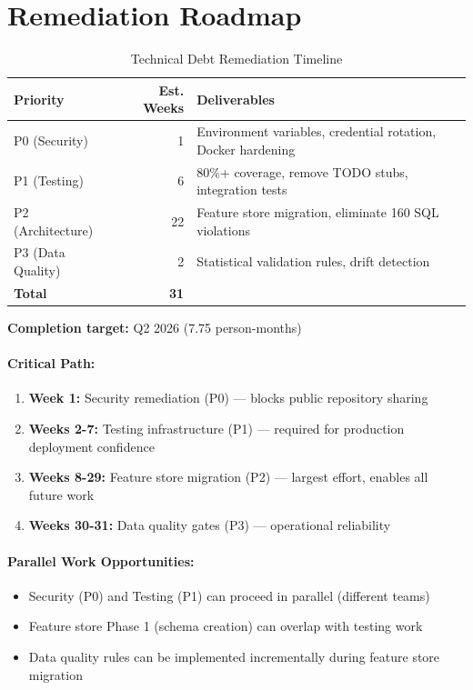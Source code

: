 \section{Remediation Roadmap}

\begin{table}[htbp]
\centering
\caption{Technical Debt Remediation Timeline}
\label{tab:remediation_timeline}
\begin{tabular}{@{}lrp{5cm}@{}}
\toprule
\textbf{Priority} & \textbf{Est. Weeks} & \textbf{Deliverables} \\
\midrule
P0 (Security) & 1 & Environment variables, credential rotation, Docker hardening \\
P1 (Testing) & 6 & 80\%+ coverage, remove TODO stubs, integration tests \\
P2 (Architecture) & 22 & Feature store migration, eliminate 160 SQL violations \\
P3 (Data Quality) & 2 & Statistical validation rules, drift detection \\
\midrule
\textbf{Total} & \textbf{31} & \\
\bottomrule
\end{tabular}
\end{table}

\textbf{Completion target:} Q2 2026 (7.75 person-months)

\paragraph{Critical Path:}
\begin{enumerate}
    \item \textbf{Week 1:} Security remediation (P0) — blocks public repository sharing
    \item \textbf{Weeks 2-7:} Testing infrastructure (P1) — required for production deployment confidence
    \item \textbf{Weeks 8-29:} Feature store migration (P2) — largest effort, enables all future work
    \item \textbf{Weeks 30-31:} Data quality gates (P3) — operational reliability
\end{enumerate}

\paragraph{Parallel Work Opportunities:}
\begin{itemize}
    \item Security (P0) and Testing (P1) can proceed in parallel (different teams)
    \item Feature store Phase 1 (schema creation) can overlap with testing work
    \item Data quality rules can be implemented incrementally during feature store migration
\end{itemize}

